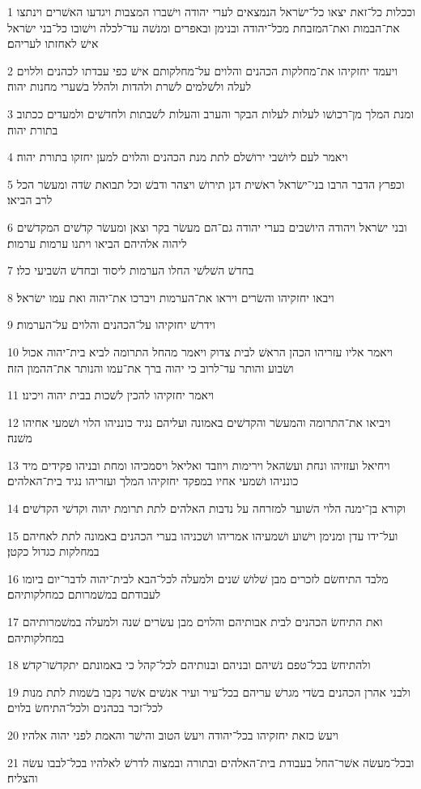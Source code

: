 \par 1 וככלות כל־זאת יצאו כל־ישׂראל הנמצאים לערי יהודה וישׁברו המצבות ויגדעו האשׁרים וינתצו את־הבמות ואת־המזבחת מכל־יהודה ובנימן ובאפרים ומנשׁה עד־לכלה וישׁובו כל־בני ישׂראל אישׁ לאחזתו לעריהם׃
\par 2 ויעמד יחזקיהו את־מחלקות הכהנים והלוים על־מחלקותם אישׁ כפי עבדתו לכהנים וללוים לעלה ולשׁלמים לשׁרת ולהדות ולהלל בשׁערי מחנות יהוה׃
\par 3 ומנת המלך מן־רכושׁו לעלות לעלות הבקר והערב והעלות לשׁבתות ולחדשׁים ולמעדים ככתוב בתורת יהוה׃
\par 4 ויאמר לעם ליושׁבי ירושׁלם לתת מנת הכהנים והלוים למען יחזקו בתורת יהוה׃
\par 5 וכפרץ הדבר הרבו בני־ישׂראל ראשׁית דגן תירושׁ ויצהר ודבשׁ וכל תבואת שׂדה ומעשׂר הכל לרב הביאו׃
\par 6 ובני ישׂראל ויהודה היושׁבים בערי יהודה גם־הם מעשׂר בקר וצאן ומעשׂר קדשׁים המקדשׁים ליהוה אלהיהם הביאו ויתנו ערמות ערמות׃
\par 7 בחדשׁ השׁלשׁי החלו הערמות ליסוד ובחדשׁ השׁביעי כלו׃
\par 8 ויבאו יחזקיהו והשׂרים ויראו את־הערמות ויברכו את־יהוה ואת עמו ישׂראל׃
\par 9 וידרשׁ יחזקיהו על־הכהנים והלוים על־הערמות׃
\par 10 ויאמר אליו עזריהו הכהן הראשׁ לבית צדוק ויאמר מהחל התרומה לביא בית־יהוה אכול ושׂבוע והותר עד־לרוב כי יהוה ברך את־עמו והנותר את־ההמון הזה׃
\par 11 ויאמר יחזקיהו להכין לשׁכות בבית יהוה ויכינו׃
\par 12 ויביאו את־התרומה והמעשׂר והקדשׁים באמונה ועליהם נגיד כונניהו הלוי ושׁמעי אחיהו משׁנה׃
\par 13 ויחיאל ועזזיהו ונחת ועשׂהאל וירימות ויוזבד ואליאל ויסמכיהו ומחת ובניהו פקידים מיד כונניהו ושׁמעי אחיו במפקד יחזקיהו המלך ועזריהו נגיד בית־האלהים׃
\par 14 וקורא בן־ימנה הלוי השׁוער למזרחה על נדבות האלהים לתת תרומת יהוה וקדשׁי הקדשׁים׃
\par 15 ועל־ידו עדן ומנימן וישׁוע ושׁמעיהו אמריהו ושׁכניהו בערי הכהנים באמונה לתת לאחיהם במחלקות כגדול כקטן׃
\par 16 מלבד התיחשׂם לזכרים מבן שׁלושׁ שׁנים ולמעלה לכל־הבא לבית־יהוה לדבר־יום ביומו לעבודתם במשׁמרותם כמחלקותיהם׃
\par 17 ואת התיחשׂ הכהנים לבית אבותיהם והלוים מבן עשׂרים שׁנה ולמעלה במשׁמרותיהם במחלקותיהם׃
\par 18 ולהתיחשׂ בכל־טפם נשׁיהם ובניהם ובנותיהם לכל־קהל כי באמונתם יתקדשׁו־קדשׁ׃
\par 19 ולבני אהרן הכהנים בשׂדי מגרשׁ עריהם בכל־עיר ועיר אנשׁים אשׁר נקבו בשׁמות לתת מנות לכל־זכר בכהנים ולכל־התיחשׂ בלוים׃
\par 20 ויעשׂ כזאת יחזקיהו בכל־יהודה ויעשׂ הטוב והישׁר והאמת לפני יהוה אלהיו׃
\par 21 ובכל־מעשׂה אשׁר־החל בעבודת בית־האלהים ובתורה ובמצוה לדרשׁ לאלהיו בכל־לבבו עשׂה והצליח׃

